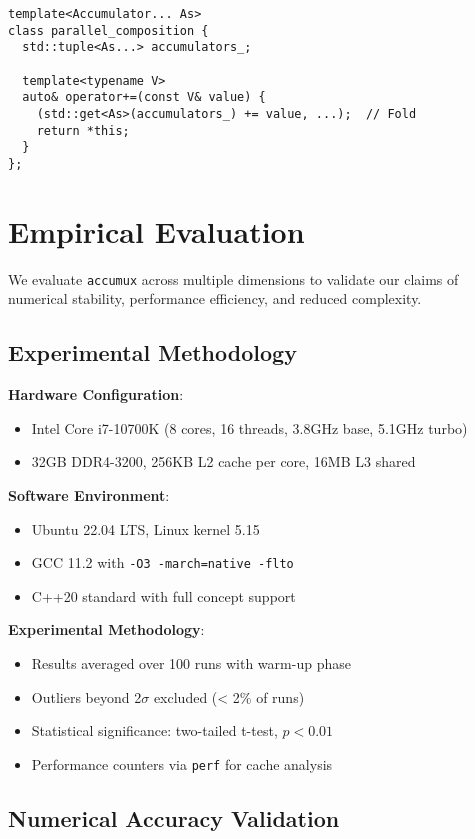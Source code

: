 \documentclass[sigconf]{acmart}
\newcommand{\accumux}{\texttt{accumux}\xspace}
\begin{document}
\begin{lstlisting}[caption={Variadic parallel composition using fold expressions}]
template<Accumulator... As>
class parallel_composition {
  std::tuple<As...> accumulators_;

  template<typename V>
  auto& operator+=(const V& value) {
    (std::get<As>(accumulators_) += value, ...);  // Fold
    return *this;
  }
};
\end{lstlisting}

\section{Empirical Evaluation}

We evaluate \accumux across multiple dimensions to validate our claims of numerical stability, performance efficiency, and reduced complexity.

\subsection{Experimental Methodology}

\textbf{Hardware Configuration}:
\begin{itemize}
\item Intel Core i7-10700K (8 cores, 16 threads, 3.8GHz base, 5.1GHz turbo)
\item 32GB DDR4-3200, 256KB L2 cache per core, 16MB L3 shared
\end{itemize}

\textbf{Software Environment}:
\begin{itemize}
\item Ubuntu 22.04 LTS, Linux kernel 5.15
\item GCC 11.2 with \texttt{-O3 -march=native -flto}
\item C++20 standard with full concept support
\end{itemize}

\textbf{Experimental Methodology}:
\begin{itemize}
\item Results averaged over 100 runs with warm-up phase
\item Outliers beyond 2$\sigma$ excluded (< 2\% of runs)
\item Statistical significance: two-tailed t-test, $p < 0.01$
\item Performance counters via \texttt{perf} for cache analysis
\end{itemize}

\subsection{Numerical Accuracy Validation}
\end{document}
